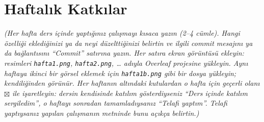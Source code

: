 \documentclass[12pt,a4paper]{article}
\newcommand{\aciklama}[1]{{\color{gray}\itshape (#1)}}
\begin{document}
 
\section{Haftalık Katkılar}
\aciklama{Her hafta ders içinde yaptığınız çalışmayı kısaca yazın (2--4 cümle). Hangi
özelliği eklediğinizi ya da neyi düzelttiğinizi belirtin ve ilgili commit mesajını
ya da bağlantısını ``Commit'' satırına yazın. Her satıra ekran görüntüsü ekleyin:
resimleri \texttt{hafta1.png}, \texttt{hafta2.png}, \ldots{} adıyla Overleaf
projesine yükleyin. Aynı haftaya ikinci bir görsel eklemek için
\texttt{hafta1b.png} gibi bir dosya yükleyin; kendiliğinden görünür.
Her haftanın altındaki kutulardan o hafta için geçerli olanı $\boxtimes$ ile
işaretleyin: dersin kendisinde katılım gösterdiyseniz ``Ders içinde katılım
sergiledim'', o haftayı sonradan tamamladıysanız ``Telafi yaptım''. Telafi
yaptıysanız yapılan çalışmanın metninde bunu açıkça belirtin.}
\end{document}
